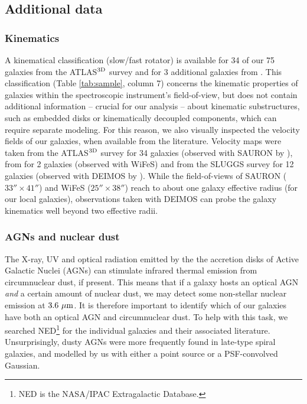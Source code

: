 \documentclass[preprint2]{emulateapj}
\begin{document}
\subsection{Additional data}
\label{sec:adddata}
\subsubsection{Kinematics}
\label{sec:kinem}
A kinematical classification (slow/fast rotator) is available for 34 of our 75 galaxies 
from the ATLAS$^{\rm 3D}$ survey \citep{atlas3dIII} 
and for 3 additional galaxies from \citet{scott2014}.
This classification (Table \ref{tab:sample}, column 7) 
concerns the kinematic properties of galaxies within the spectroscopic instrument's field-of-view, 
but does not contain additional information -- crucial for our analysis -- about kinematic substructures, 
such as embedded disks or kinematically decoupled components, 
which can require separate modeling.
For this reason, we also visually inspected the velocity fields of our galaxies, 
when available from the literature.
Velocity maps were taken from the ATLAS$^{\rm 3D}$ survey for 34 galaxies 
(observed with SAURON by \citealt{krajnovic2011}),
from \citet{scott2014} for 2 galaxies 
(observed with WiFeS)
and from the SLUGGS survey for 12 galaxies 
(observed with DEIMOS by \citealt{arnold2014}).
While the field-of-views of SAURON ($33'' \times 41''$) and WiFeS ($25'' \times 38''$) 
reach to about one galaxy effective radius (for our local galaxies),
observations taken with DEIMOS can probe the galaxy kinematics well beyond two effective radii.

\subsubsection{AGNs and nuclear dust}
The X-ray, UV and optical radiation 
emitted by the the accretion disks of Active Galactic Nuclei (AGNs) can stimulate infrared thermal emission 
from circumnuclear dust, if present. 
This means that if a galaxy hosts an optical AGN \emph{and} a certain amount of nuclear dust,
we may detect some non-stellar nuclear emission at $3.6~\rm \mu m$.
It is therefore important to identify which of our galaxies have both an optical AGN and circumnuclear dust.
To help with this task, we searched NED\footnote{NED is the NASA/IPAC Extragalactic Database.} 
for the individual galaxies and their associated literature.
Unsurprisingly, dusty AGNs were more frequently found in late-type spiral galaxies, 
and modelled by us with either a point source or a PSF-convolved Gaussian.
\end{document}
